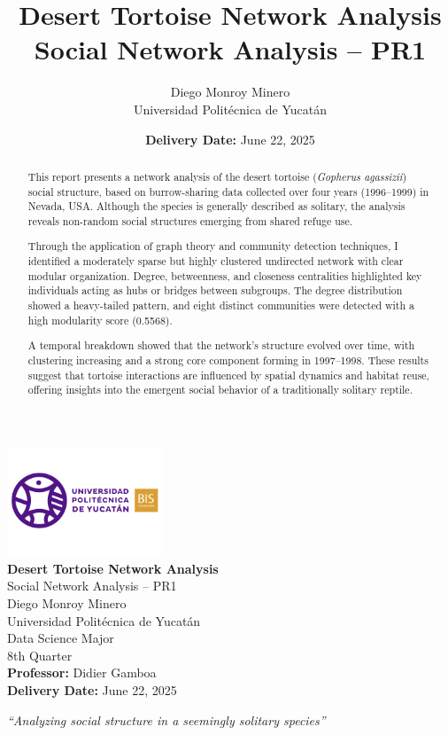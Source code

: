 \documentclass[12pt]{report}
\title{\Huge Desert Tortoise Network Analysis\\[1ex]
        \large Social Network Analysis – PR1}
\author{Diego Monroy Minero\\[0.5ex]Universidad Politécnica de Yucatán}
\date{\textbf{Delivery Date:} June 22, 2025}
\begin{document}
\begin{titlepage}
    \thispagestyle{empty}
    \begin{center}
        \vspace*{2cm}
        \includegraphics[width=0.35\textwidth]{Images/Logo UPY.png}\\[2cm]
        {\Huge \textbf{Desert Tortoise Network Analysis}}\\[1.5ex]
        {\Large Social Network Analysis – PR1}\\[2cm]
        {\Large Diego Monroy Minero}\\[0.5ex]
        {\large Universidad Politécnica de Yucatán}\\[0.5ex]
        {\large Data Science Major}\\[0.5ex]
        {\large 8th Quarter}\\[1.5cm]
        {\large \textbf{Professor:} Didier Gamboa}\\[2cm]
        {\Large \textbf{Delivery Date:} June 22, 2025}\\
    \end{center}
    \vfill
    \begin{center}
        \large\textit{“Analyzing social structure in a seemingly solitary species”}
    \end{center}
\end{titlepage}

\begin{abstract}
This report presents a network analysis of the desert tortoise (\textit{Gopherus agassizii}) social structure, based on burrow-sharing data collected over four years (1996–1999) in Nevada, USA. Although the species is generally described as solitary, the analysis reveals non-random social structures emerging from shared refuge use.

Through the application of graph theory and community detection techniques, I identified a moderately sparse but highly clustered undirected network with clear modular organization. Degree, betweenness, and closeness centralities highlighted key individuals acting as hubs or bridges between subgroups. The degree distribution showed a heavy-tailed pattern, and eight distinct communities were detected with a high modularity score (0.5568).

A temporal breakdown showed that the network's structure evolved over time, with clustering increasing and a strong core component forming in 1997–1998. These results suggest that tortoise interactions are influenced by spatial dynamics and habitat reuse, offering insights into the emergent social behavior of a traditionally solitary reptile.
\end{abstract}
\end{document}
